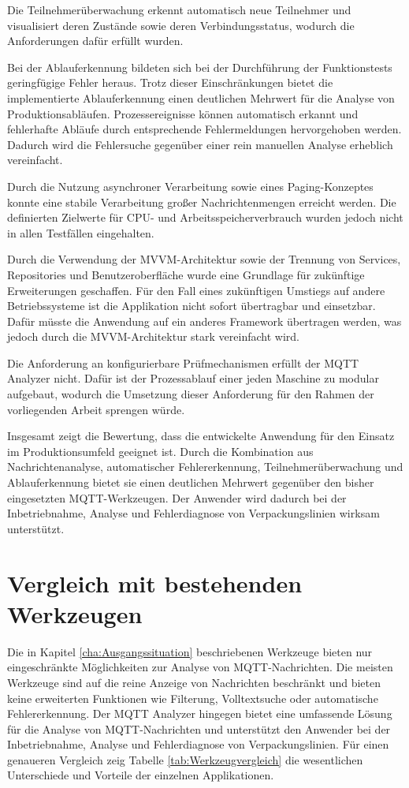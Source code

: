 Die Teilnehmerüberwachung erkennt automatisch neue Teilnehmer und visualisiert deren Zustände sowie deren Verbindungsstatus, wodurch die Anforderungen dafür erfüllt wurden.

Bei der Ablauferkennung bildeten sich bei der Durchführung der Funktionstests geringfügige Fehler heraus. Trotz dieser Einschränkungen bietet die implementierte Ablauferkennung einen deutlichen Mehrwert für die Analyse von Produktionsabläufen. Prozessereignisse können automatisch erkannt und fehlerhafte Abläufe durch entsprechende Fehlermeldungen hervorgehoben werden. Dadurch wird die Fehlersuche gegenüber einer rein manuellen Analyse erheblich vereinfacht.

Durch die Nutzung asynchroner Verarbeitung sowie eines Paging-Konzeptes konnte eine stabile Verarbeitung großer Nachrichtenmengen erreicht werden. Die definierten Zielwerte für CPU- und Arbeitsspeicherverbrauch wurden jedoch nicht in allen Testfällen eingehalten. 

Durch die Verwendung der MVVM-Architektur sowie der Trennung von Services, Repositories und Benutzeroberfläche wurde eine Grundlage für zukünftige Erweiterungen geschaffen. Für den Fall eines zukünftigen Umstiegs auf andere Betriebssysteme ist die Applikation nicht sofort übertragbar und einsetzbar. Dafür müsste die Anwendung auf ein anderes Framework übertragen werden, was jedoch durch die MVVM-Architektur stark vereinfacht wird.

Die Anforderung an konfigurierbare Prüfmechanismen erfüllt der MQTT Analyzer nicht. Dafür ist der Prozessablauf einer jeden Maschine zu modular aufgebaut, wodurch die Umsetzung dieser Anforderung für den Rahmen der vorliegenden Arbeit sprengen würde.

Insgesamt zeigt die Bewertung, dass die entwickelte Anwendung für den Einsatz im Produktionsumfeld geeignet ist. Durch die Kombination aus Nachrichtenanalyse, automatischer Fehlererkennung, Teilnehmerüberwachung und Ablauferkennung bietet sie einen deutlichen Mehrwert gegenüber den bisher eingesetzten MQTT-Werkzeugen. Der Anwender wird dadurch bei der Inbetriebnahme, Analyse und Fehlerdiagnose von Verpackungslinien wirksam unterstützt.

\section{Vergleich mit bestehenden Werkzeugen}
Die in Kapitel \ref{cha:Ausgangssituation} beschriebenen Werkzeuge bieten nur eingeschränkte Möglichkeiten zur Analyse von MQTT-Nachrichten. Die meisten Werkzeuge sind auf die reine Anzeige von Nachrichten beschränkt und bieten keine erweiterten Funktionen wie Filterung, Volltextsuche oder automatische Fehlererkennung. Der MQTT Analyzer hingegen bietet eine umfassende Lösung für die Analyse von MQTT-Nachrichten und unterstützt den Anwender bei der Inbetriebnahme, Analyse und Fehlerdiagnose von Verpackungslinien. Für einen genaueren Vergleich zeig Tabelle \ref{tab:Werkzeugvergleich} die wesentlichen Unterschiede und Vorteile der einzelnen Applikationen. 

